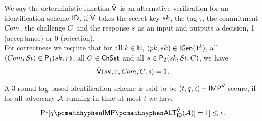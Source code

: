 \begin{definition}
We say the deterministic function $\tilde{\mathsf{V}}$ is an alternative verification for an identification scheme $\mathsf{ID}$, if $\tilde{\mathsf{V}}$ takes the secret key $sk$, the tag $\tau$, the commitment $Com$, the challenge $C$ and the response $s$ as an input and outputs a decision, 1 (acceptance) or 0 (rejection).
\\
For correctness we require that for all $k \in \mathbb{N}$,
$(pk,sk) \in \mathsf{IGen}(1^k)$,
all
$(Com,St) \in \mathsf{P}_1(sk, \tau)$,
all $C \in \mathsf{ChSet}$ and all 
$s \in \mathsf{P}_2(sk,St,C)$,
we have
$$ \tilde{\mathsf{V}}(sk,\tau,Com,C,s) = 1.$$

\end{definition}

\begin{definition}
A 3-round tag based identification scheme is said to be $(t,q,\epsilon)-\mathsf{IMP}^{\tilde{\mathsf{V}}}$ secure, if for all adversary $\mathcal{A}$ running in time at most $t$ we have
$$\Pr[q\hyph\xsoundness^{\IDAltV}_{\ID}(\adv)]=1] \leq \epsilon.$$
\end{definition}



\begin{figure}[htb!]
    \centering
    \nicoresetlinenr
    \caption{}
    \label{fig:x-soundess}
\end{figure}




